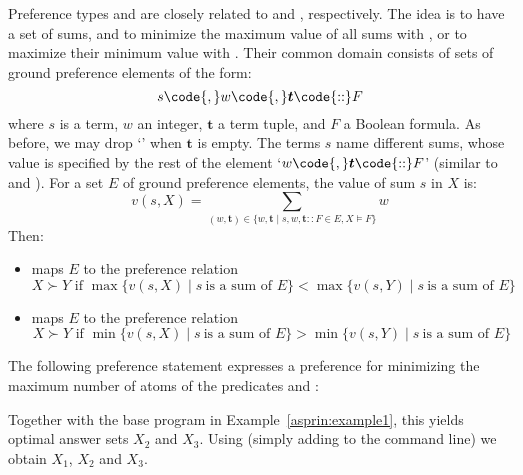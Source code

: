 Preference types  and  are 
closely related to  and , 
respectively.
%
The idea is to have a set of sums, 
and to minimize the maximum value of all sums with , 
or to maximize their minimum value with .
%
Their common domain consists of sets of ground preference elements of the form:
\[s\code{,}w\code{,}\boldsymbol{t}\code{::}F\]
where $s$ is a term, ${w}$ an integer, 
$\boldsymbol{t}$ a term tuple, and $F$ a Boolean formula.
%
As before, we may drop `\code{,}' when $\boldsymbol{t}$ is empty.
%
The terms $s$ name different sums,
whose value is specified by the rest of the element 
`$w\code{,}\boldsymbol{t}\code{::}F$'
(similar to  and ).
%
For a set $E$ of ground preference elements, 
the value of sum $s$ in $X$ is:
\[
v(s,X)=\sum_{(w,\boldsymbol{t})\in
\{w,\boldsymbol{t}\mid s,w,\boldsymbol{t}\mathtt{::}F\in E, X\models F\}}w
\]
Then:
\begin{itemize}
\item
{} maps $E$ to the preference relation%
\[
X \succ Y \text{ if } 
\max \{ v(s,X) \mid s \ \text{is a sum of } E \} < 
\max \{ v(s,Y) \mid s \ \text{is a sum of } E \} 
\]
\item
{} maps $E$ to the preference relation%
\[
X \succ Y \text{ if } 
\min \{ v(s,X) \mid s \ \text{is a sum of } E \} > 
\min \{ v(s,Y) \mid s \ \text{is a sum of } E \} 
\]
\end{itemize}
\begin{example}\label{asprin:minmaxexample}
%
%
The following preference statement 
expresses a preference for 
minimizing the maximum number of atoms of the predicates  and :
%

%
Together with the base program in Example~\ref{asprin:example1}, this yields optimal answer sets $X_2$ and $X_3$.
%
Using  (simply adding  to the command line) we obtain $X_1$, $X_2$ and $X_3$.
\end{example} %



